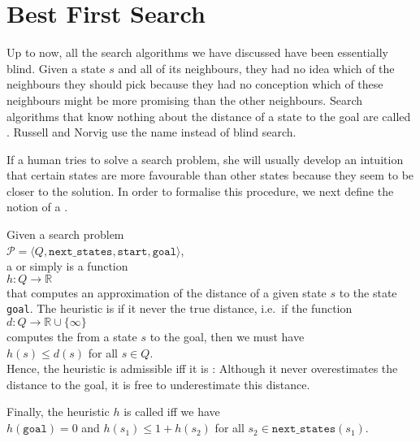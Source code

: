 \section{Best First Search}
Up to now, all the search algorithms we have discussed have been essentially blind.  Given a state $s$ and
all of its neighbours, they had no idea which of the neighbours they should pick because they had no conception
which of these neighbours might be more promising than the other neighbours.  Search algorithms that know nothing
about the distance of a state to the goal are called .  
Russell and Norvig \cite{russell:2020} use the name  instead of blind search.

If a human tries to solve a search
problem, she will usually develop an intuition that certain states are more favourable than other states because
they seem to be closer to the solution.  In order to formalise this procedure, we next define the notion of a
. 


\begin{Definition}
Given a search problem
\\[0.2cm]
\hspace*{1.3cm}
$\mathcal{P} = \langle Q, \mathtt{next\_states}, \mathtt{start}, \mathtt{goal} \rangle$,
\\[0.2cm]
a  or simply  is a function 
\\[0.2cm]
\hspace*{1.3cm}
$h: Q \rightarrow \mathbb{R}$
\\[0.2cm]
that computes an approximation of the distance of a given state $s$ to the state \texttt{goal}.
The heuristic is   if it never
\underline{\color{red}{overestimates}} the true distance, i.e.~if the function 
\\[0.2cm]
\hspace*{1.3cm}
$d:Q \rightarrow \mathbb{R}\cup \{ \infty\}$
\\[0.2cm]
computes the  from a state $s$ to the goal, then we must have
\\[0.2cm]
\hspace*{1.3cm}
$h(s) \leq d(s)$ \quad for all $s \in Q$.
\\[0.2cm]
Hence, the heuristic is admissible iff it is : 
Although it never overestimates the distance to the goal, it is free to underestimate this distance.

Finally, the  heuristic $h$ is called   iff we have 
\\[0.2cm]
\hspace*{1.3cm}
$h(\mathtt{goal}) = 0$ \quad and \quad $h(s_1) \leq 1 + h(s_2)$ \quad for all $s_2 \in \mathtt{next\_states}(s_1)$.  \eod
\end{Definition}

